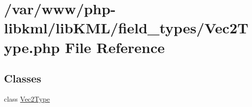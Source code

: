 \hypertarget{Vec2Type_8php}{
\section{/var/www/php-\/libkml/libKML/field\_\-types/Vec2Type.php File Reference}
\label{de/dba/Vec2Type_8php}
}
\subsection*{Classes}
\begin{DoxyCompactItemize}
\item 
class \hyperlink{classVec2Type}{Vec2Type}
\end{DoxyCompactItemize}
